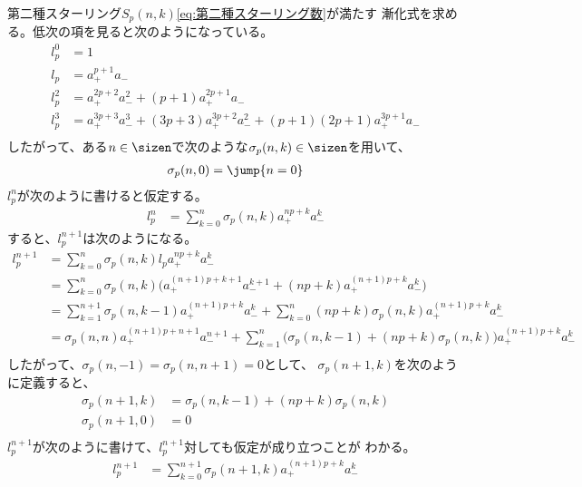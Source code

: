 	第二種スターリング$S_p(n,k)$\eqref{eq:第二種スターリング数}が満たす
	漸化式を求める。低次の項を見ると次のようになっている。
	\begin{equation*}\begin{split} %
		l_p^0 &= 1 \\
		l_p &= a_+^{p+1}a_- \\
		l_p^2 &= a_+^{2p+2}a_-^2 + (p+1)a_+^{2p+1}a_- \\
		l_p^3 &= a_+^{3p+3}a_-^3 + (3p+3)a_+^{3p+2}a_-^2 
			+ (p+1)(2p+1)a_+^{3p+1}a_- \\
	\end{split}\end{equation*} %
	したがって、ある$n\in\sizen$で次のような$\sigma_p(n,k)\in\sizen$を用いて、
	\begin{equation*}\begin{split} %
		\sigma_p(n, 0) &= \jump{n=0} \\
	\end{split}\end{equation*} %
	$l_p^n$が次のように書けると仮定する。
	\begin{equation*}\begin{split} %
		l_p^n &= \sum_{k=0}^n\sigma_p(n,k)a_+^{np+k}a_-^k
	\end{split}\end{equation*} %
	すると、$l_p^{n+1}$は次のようになる。
	\begin{equation*}\begin{split} %
		l_p^{n+1} &= \sum_{k=0}^n\sigma_p(n,k)l_pa_+^{np+k}a_-^k \\
		&= \sum_{k=0}^n\sigma_p(n,k)\bigl(a_+^{(n+1)p+k+1}a_-^{k+1}
			+ (np+k)a_+^{(n+1)p+k}a_-^k\bigr) \\
		&= \sum_{k=1}^{n+1}\sigma_p(n,k-1)a_+^{(n+1)p+k}a_-^k
			+ \sum_{k=0}^n(np+k)\sigma_p(n,k)a_+^{(n+1)p+k}a_-^k \\
		&= \sigma_p(n,n)a_+^{(n+1)p+n+1}a_-^{n+1}
			+ \sum_{k=1}^n\bigl(\sigma_p(n,k-1) + (np+k)\sigma_p(n,k)\bigr)
			a_+^{(n+1)p+k}a_-^k \\
	\end{split}\end{equation*} %
	したがって、$\sigma_p(n,-1)=\sigma_p(n,n+1)=0$として、
	$\sigma_p(n+1,k)$を次のように定義すると、
	\begin{equation*}\begin{split} %
		\sigma_p(n+1,k) &= \sigma_p(n,k-1) + (np+k)\sigma_p(n,k) \\
		\sigma_p(n+1,0) &= 0 \\
	\end{split}\end{equation*} %
	$l_p^{n+1}$が次のように書けて、$l_p^{n+1}$対しても仮定が成り立つことが
	わかる。
	\begin{equation*}\begin{split} %
		l_p^{n+1} &= \sum_{k=0}^{n+1}\sigma_p(n+1,k)a_+^{(n+1)p+k}a_-^k
	\end{split}\end{equation*} %

